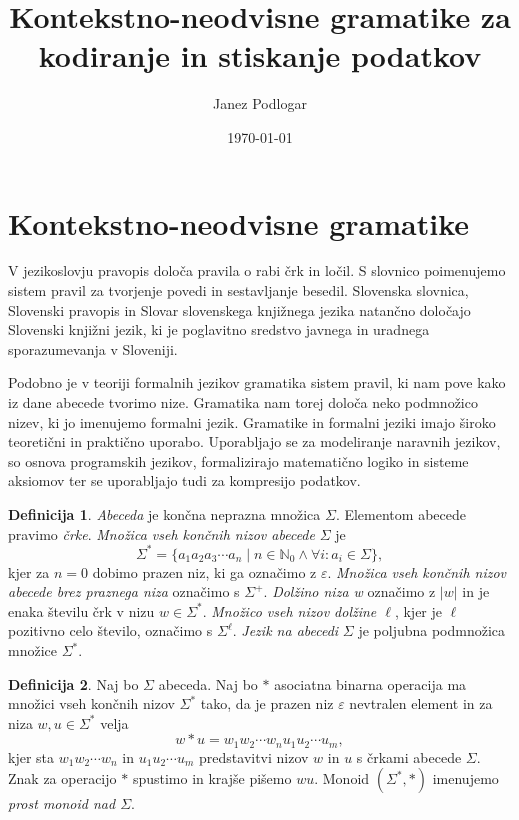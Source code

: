 \documentclass{amsart}
\title{Kontekstno-neodvisne gramatike za kodiranje in stiskanje podatkov}
\author{Janez Podlogar}
\date{\today}
\newcommand{\N}{\mathbb{N}}
\theoremstyle{definition}
\newtheorem{definicija}{Definicija}[section]
\theoremstyle{plain} %
\begin{document}




\maketitle

\section{Kontekstno-neodvisne gramatike}

V jezikoslovju pravopis določa pravila o rabi črk in ločil. S slovnico poimenujemo sistem pravil za tvorjenje
povedi in sestavljanje besedil. Slovenska slovnica, Slovenski pravopis in Slovar slovenskega knjižnega jezika
natančno določajo Slovenski knjižni jezik, ki je poglavitno sredstvo javnega in uradnega sporazumevanja v Sloveniji.


Podobno je v teoriji formalnih jezikov gramatika sistem pravil, ki nam pove kako iz dane abecede tvorimo nize. Gramatika nam torej določa
neko podmnožico nizev, ki jo imenujemo formalni jezik. Gramatike in formalni jeziki imajo široko teoretični in praktično
uporabo. Uporabljajo se za modeliranje naravnih jezikov, so osnova programskih jezikov, formalizirajo matematično logiko in
sisteme aksiomov ter se uporabljajo tudi za kompresijo podatkov.

\begin{definicija}

    \textit{Abeceda} je končna neprazna množica $ \Sigma $. Elementom abecede pravimo \textit{črke}.
    \textit{Množica vseh končnih nizov abecede} $ \Sigma $ je
    \[
        \Sigma^* = \{ a_1 a_2 a_3 \cdots a_n \mid n \in \N_0 \land \forall i: a_i \in \Sigma \}, 
    \]
    kjer za $ n = 0 $ dobimo prazen niz, ki ga označimo z $ \varepsilon $.
    \textit{Množica vseh končnih nizov abecede brez praznega niza} označimo s $ \Sigma^+ $.
    \textit{Dolžino niza w} označimo z $ |w| $ in je enaka številu črk v nizu $ w \in \Sigma^* $.
    \textit{Množico vseh nizov dolžine $ \ell $}, kjer je $ \ell $ pozitivno celo število, označimo s $ \Sigma^\ell $.
    \textit{Jezik na abecedi} $ \Sigma $ je poljubna podmnožica množice $ \Sigma^* $.
    

\end{definicija}

\begin{definicija}
    
    Naj bo $ \Sigma $ abeceda. Naj bo $ * $ asociatna binarna operacija ma množici vseh končnih nizov $ \Sigma^* $
    tako, da je prazen niz $ \varepsilon $ nevtralen element in za niza $ w, u \in \Sigma^* $ velja
    \[
        w*u = w_1w_2 \cdots w_nu_1u_2 \cdots u_m,
    \]
    kjer sta $ w_1w_2 \cdots w_n $ in $ u_1u_2 \cdots u_m $ predstavitvi nizov $ w $ in $ u $ s črkami abecede $ \Sigma $.
    Znak za operacijo $ * $ spustimo in krajše pišemo $ wu $. Monoid $ (\Sigma^*, *) $ imenujemo 
    \textit{prost monoid nad $ \Sigma $}.

\end{definicija}
\end{document}
